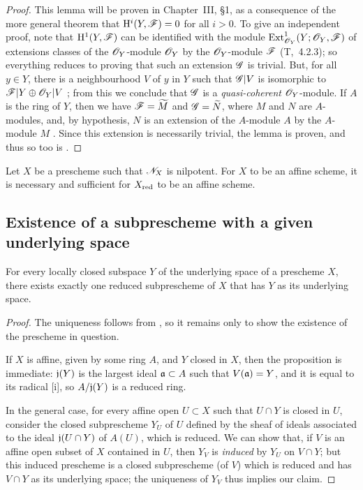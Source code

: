 \begin{proof}
\label{proof-1.5.1.9}
This lemma will be proven in Chapter~III, §1, as a consequence of the more general theorem that $\mathrm{H}^i(Y,\mathscr{F})=0$ for all $i>0$.
To give an independent proof, note that $\mathrm{H}^1(Y,\mathscr{F})$ can be identified with the module ${\mathop{\mathrm{Ext}}\nolimits}_{\mathscr{O}_Y}^1(Y;\mathscr{O}_Y,\mathscr{F})$ of extensions classes of the $\mathscr{O}_Y$-module $\mathscr{O}_Y$ by the $\mathscr{O}_Y$-module $\mathscr{F}$ (T,~4.2.3);
so everything reduces to proving that such an extension $\mathscr{G}$ is trivial.
But, for all $y\in Y$, there is a neighbourhood $V$ of $y$ in $Y$ such that $\mathscr{G}|V$ is isomorphic to $\mathscr{F}|Y\oplus\mathscr{O}_Y|V$ ;
from this we conclude that $\mathscr{G}$ is a \emph{quasi-coherent} $\mathscr{O}_Y$-module.
If $A$ is the ring of $Y$, then we have $\mathscr{F}={\widetilde{M}}$ and $\mathscr{G}={\widetilde{N}}$, where $M$ and $N$ are $A$-modules, and, by hypothesis, $N$ is an extension of the $A$-module $A$ by the $A$-module $M$ .
Since this extension is necessarily trivial, the lemma is proven, and thus so too is .
\end{proof}

\begin{cor}[5.1.10]
\label{1.5.1.10}
Let $X$ be a prescheme such that $\mathscr{N}_X$ is nilpotent.
For $X$ to be an affine scheme, it is necessary and sufficient for $X_{\mathrm{red}}$ to be an affine scheme.
\end{cor}

\subsection{Existence of a subprescheme with a given underlying space}
\label{subsection:existence-of-a-subprescheme-with-a-given-underlying-space}

\begin{prop}[5.2.1]
\label{1.5.2.1}
For every locally closed subspace $Y$ of the underlying space of a prescheme $X$, there exists exactly one reduced subprescheme of $X$ that has $Y$ as its underlying space.
\end{prop}

\begin{proof}
\label{proof-1.5.2.1}
The uniqueness follows from , so it remains only to show the existence of the prescheme in question.

If $X$ is affine, given by some ring $A$, and $Y$ closed in $X$, then the proposition is immediate:
$\mathfrak{j}(Y)$ is the largest ideal $\mathfrak{a}\subset A$ such that $V(\mathfrak{a})=Y$, and it is equal to its radical [i], so $A/\mathfrak{j}(Y)$ is a reduced ring.

In the general case, for every affine open $U\subset X$ such that $U\cap Y$ is closed in $U$, consider the closed subprescheme $Y_U$ of $U$ defined by the sheaf of ideals associated to the ideal $\mathfrak{j}(U\cap Y)$ of $A(U)$, which is reduced.
We can show that, if $V$ is an affine open subset of $X$ contained in $U$, then $Y_V$ is \emph{induced} by $Y_U$ on $V\cap Y$;
but this induced prescheme is a closed subprescheme (of $V$) which is reduced and has $V\cap Y$ as its underlying space;
the uniqueness of $Y_V$ thus implies our claim.
\end{proof}

